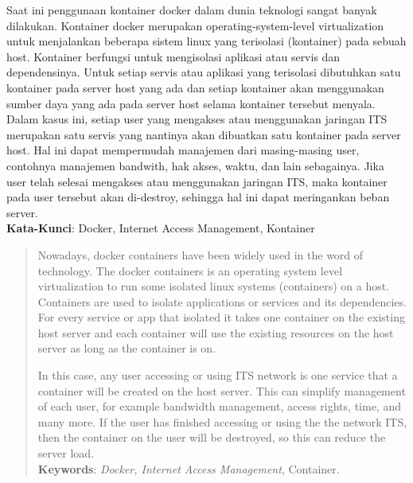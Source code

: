 \begin{abstrak}
	\indent Saat ini penggunaan kontainer docker dalam dunia teknologi sangat banyak dilakukan. Kontainer docker merupakan operating-system-level virtualization untuk menjalankan beberapa sistem linux yang terisolasi (kontainer) pada sebuah host. Kontainer berfungsi untuk mengisolasi aplikasi atau servis dan dependensinya. Untuk setiap servis atau aplikasi yang terisolasi dibutuhkan satu kontainer pada server host yang ada dan setiap kontainer akan menggunakan sumber daya yang ada pada server host selama kontainer tersebut menyala.\\
    	\indent Dalam kasus ini, setiap user yang mengakses atau menggunakan jaringan ITS merupakan satu servis yang nantinya akan dibuatkan satu kontainer pada server host. Hal ini dapat mempermudah manajemen dari masing-masing user, contohnya manajemen bandwith, hak akses, waktu, dan lain sebagainya. Jika user telah selesai mengakses atau menggunakan jaringan ITS, maka kontainer pada user tersebut akan di-destroy, sehingga hal ini dapat meringankan beban server.\\

\noindent \textbf{Kata-Kunci}:  Docker, Internet Access Management, Kontainer
\end{abstrak}

\cleardoublepage
\begin{abstract}
	\indent Nowadays, docker containers have been widely used in the word of technology. The docker containers is an operating system level virtualization to run some isolated linux systems (containers) on a host. Containers are used to isolate applications or services and its dependencies. For every service or app that isolated it takes one container on the existing host server and each container will use the existing resources on the host server as long as the container is on.
	
	In this case, any user accessing or using ITS network is one service that a container will be created on the host server. This can simplify management of each user, for example bandwidth management, access rights, time, and many more. If the user has finished accessing or using the the network ITS, then the container on the user will be destroyed, so this can reduce the server load. \\

\noindent \textbf{Keywords}:  \textit{Docker, Internet Access Management}, Container.
\end{abstract}